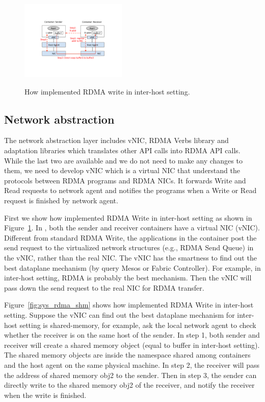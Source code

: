      \begin{figure}[th]
     \centering 
     \includegraphics[width=0.45\textwidth]{figures/system/sys_rdma_rdma.pdf}
     \label{fig:sys_rdma_rdma}
     \caption{How \sysname implemented RDMA write in inter-host setting.} 
     \end{figure}


\subsection{Network abstraction}
The network abstraction layer includes vNIC, RDMA Verbs library and adaptation
libraries which translates other API calls into RDMA API calls. 
While the last two are available and we do not need to make any changes to them,
we need to develop vNIC which is a virtual NIC that understand the protocols
between RDMA programs and RDMA NICs. It forwards Write and Read requests to 
network agent and notifies the programs when a Write or Read request is finished
by network agent. 


 First we show 
how \sysname implemented RDMA Write in inter-host setting
as shown in Figure~\ref{fig:sys_rdma_rdma}. 
In \sysname, both the sender and receiver containers have a virtual NIC (vNIC).
Different from standard RDMA Write, the applications in the container post
the send request to the virtualized network structures (e.g., RDMA Send Queue)
in the vNIC, rather than the real NIC.
The vNIC has the smartness to find out the best dataplane mechanism (by query
Mesos or Fabric Controller).
For example, in inter-host setting, RDMA is probably the best mechanism. Then
the vNIC will pass down the send request to the real NIC for RDMA transfer.


 Figure~\ref{fig:sys_rdma_shm} shows 
how \sysname implemented RDMA Write in inter-host setting.
Suppose the vNIC can find out the best dataplane mechanism for inter-host setting
is shared-memory, for example, ask the local network agent to check whether the 
receiver is on the same host of the sender.
 In step 1, both sender and receiver will create a shared memory object (equal 
to buffer in inter-host setting). The shared memory objects are inside the namespace
shared among containers and the host agent on the same physical machine.
In step 2, the receiver will pass the address of shared memory obj2 to the sender.
Then in step 3, the sender can directly write to the shared memory obj2 of the
receiver, and notify the receiver when the write is finished.



